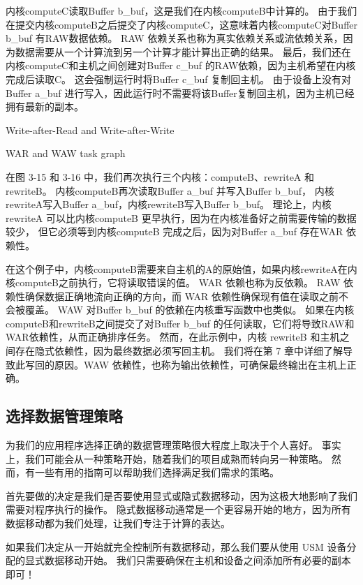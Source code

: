 内核computeC读取Buffer b\_buf，这是我们在内核computeB中计算的。 
由于我们在提交内核computeB之后提交了内核computeC，这意味着内核computeC对Buffer b\_buf 有RAW数据依赖。 
RAW 依赖关系也称为真实依赖关系或流依赖关系，因为数据需要从一个计算流到另一个计算才能计算出正确的结果。 
最后，我们还在内核computeC和主机之间创建对Buffer c\_buf 的RAW依赖，因为主机希望在内核完成后读取C。 
这会强制运行时将Buffer c\_buf 复制回主机。 
由于设备上没有对Buffer a\_buf 进行写入，因此运行时不需要将该Buffer复制回主机，因为主机已经拥有最新的副本。

{\color{red} Write-after-Read and Write-after-Write}

{\color{red} WAR and WAW task graph}

在图 3-15 和 3-16 中，我们再次执行三个内核：computeB、rewriteA 和 rewriteB。 
内核computeB再次读取Buffer a\_buf 并写入Buffer b\_buf，
内核rewriteA写入Buffer a\_buf，内核rewriteB写入Buffer b\_buf。 
理论上，内核 rewriteA 可以比内核computeB 更早执行，因为在内核准备好之前需要传输的数据较少，
但它必须等到内核computeB 完成之后，因为对Buffer a\_buf 存在WAR 依赖性。

在这个例子中，内核computeB需要来自主机的A的原始值，如果内核rewriteA在内核computeB之前执行，它将读取错误的值。 
WAR 依赖也称为反依赖。 RAW 依赖性确保数据正确地流向正确的方向，而 WAR 依赖性确保现有值在读取之前不会被覆盖。 
WAW 对Buffer b\_buf 的依赖在内核重写函数中也类似。 
如果在内核computeB和rewriteB之间提交了对Buffer b\_buf 的任何读取，它们将导致RAW和WAR依赖性，从而正确排序任务。 
然而，在此示例中，内核 rewriteB 和主机之间存在隐式依赖性，因为最终数据必须写回主机。 
我们将在第 7 章中详细了解导致此写回的原因。WAW 依赖性，也称为输出依赖性，可确保最终输出在主机上正确。

\subsection{选择数据管理策略}
为我们的应用程序选择正确的数据管理策略很大程度上取决于个人喜好。 
事实上，我们可能会从一种策略开始，随着我们的项目成熟而转向另一种策略。 
然而，有一些有用的指南可以帮助我们选择满足我们需求的策略。

首先要做的决定是我们是否要使用显式或隐式数据移动，因为这极大地影响了我们需要对程序执行的操作。 
隐式数据移动通常是一个更容易开始的地方，因为所有数据移动都为我们处理，让我们专注于计算的表达。

如果我们决定从一开始就完全控制所有数据移动，那么我们要从使用 USM 设备分配的显式数据移动开始。 
我们只需要确保在主机和设备之间添加所有必要的副本即可！

